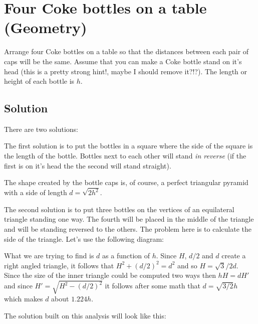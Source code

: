 \section{Four Coke bottles on a table (Geometry)}
Arrange four Coke bottles on a table so that the distances between each pair of caps will be the same. Assume that
you can make a Coke bottle stand on it's head (this is a pretty strong hint!, maybe I should remove it?!?). The length
or height of each bottle is ${h}$.

\subsection{Solution}
There are two solutions:

The first solution is to put the bottles in a square where the side of the square is the length of the bottle. Bottles
next to each other will stand \emph{in reverse} (if the first is on it's head the the second will stand straight).

\begin{center}

\end{center}

The shape created by the bottle caps is, of course, a perfect triangular pyramid with a side of length $d=\sqrt{2h^2}$.

The second solution is to put three bottles on the vertices of an equilateral triangle standing one way. The fourth will be placed
in the middle of the triangle and will be standing reversed to the others. The problem here is to calculate the side of the triangle.
Let's use the following diagram:

\begin{center}

\end{center}

What we are trying to find is $d$ as a function of $h$. Since $H$, $d/2$ and $d$ create a right angled triangle, it follows
that $H^2+(d/2)^2=d^2$ and so $H=\sqrt{3}/2d$. Since the size of the inner triangle could be computed two ways then $hH=dH'$ and
since $H'=\sqrt{H^2-(d/2)^2}$ it follows after some math that $d=\sqrt{3/2}h$ which makes $d$ about $1.224h$.

The solution built on this analysis will look like this:

\begin{center}

\end{center}

